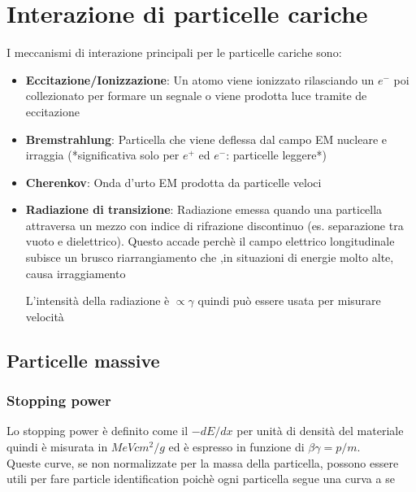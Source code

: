 \section{Interazione di particelle cariche}
I meccanismi di interazione principali per le particelle cariche sono:
\begin{itemize}

    \item \textbf{Eccitazione/Ionizzazione}: Un atomo viene ionizzato rilasciando un $e^-$ poi collezionato per formare un segnale o viene prodotta luce tramite de eccitazione

    \item \textbf{Bremstrahlung}: Particella che viene deflessa dal campo EM nucleare e irraggia (*significativa solo per $e^+$ ed $e^{-}$: particelle leggere*)

    \item \textbf{Cherenkov}: Onda d'urto EM prodotta da particelle veloci

    \item \textbf{Radiazione di transizione}: Radiazione emessa quando una particella attraversa un mezzo con indice di rifrazione discontinuo (es. separazione tra vuoto e dielettrico). Questo accade perchè il campo elettrico longitudinale subisce un brusco riarrangiamento che ,in situazioni di energie molto alte, causa irraggiamento

    L'intensità della radiazione è $\propto \gamma$ quindi può essere usata per misurare velocità

\end{itemize}

\subsection{Particelle massive}
    \subsubsection*{Stopping power}
        Lo stopping power è definito come il $-dE/dx$ per unità di densità del materiale quindi è misurata in $MeV cm^2/g$  ed è espresso in funzione di $\beta \gamma=p/m$.
        \\
        Queste curve, se non normalizzate per la massa della particella, possono essere utili per fare particle identification poichè ogni particella segue una curva a se

